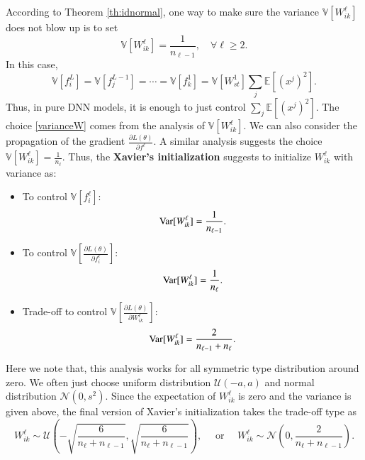 According to Theorem \ref{th:idnormal}, one way to make sure the variance $\mathbb{V}[W^\ell_{ik}]$ does not blow up is to set 
\begin{equation}\label{varianceW}
\mathbb{V}[W^\ell_{ik}] = \frac{1}{n_{\ell-1}}, \quad \forall \ell \ge 2.
\end{equation}
In this case,
\begin{equation}
\mathbb V [f^{L}_i] = \mathbb V [f^{L-1}_j] = \cdots =  \mathbb V [f^{1}_k] = \mathbb{V}[W^1_{st}]\sum_{j}\mathbb{E}[(x^j)^2].
\end{equation}
Thus, in pure DNN models, it is enough to just control $\displaystyle \sum_{j}\mathbb{E}[(x^j)^2]$.
The choice \eqref{varianceW} comes from the analysis of $\mathbb{V}[W^\ell_{ik}]$. We can also consider the propagation of the gradient $\frac{\partial L(\theta)}{\partial f^\ell}$. A similar analysis suggests the choice 
$
\mathbb{V}[W^\ell_{ik}] = \frac{1}{n_{\ell}}.
$
Thus, the {\bf Xavier's initialization} suggests to initialize $W^\ell_{ik}$ with variance as:
\begin{itemize}
	\item To control $\mathbb V [f^{\ell}_i] $:
	\begin{equation}\label{key}
	{\rm Var}[W^\ell_{ik}] = \frac{1}{n_{\ell-1}}.
	\end{equation}
	\item To control $\mathbb{V}[\frac{\partial L(\theta)}{\partial f_i^\ell}]$:
	\begin{equation}\label{key}
	{\rm Var}[W^\ell_{ik}] = \frac{1}{n_{\ell}}.
	\end{equation}
	\item Trade-off to control $\mathbb{V} [\frac{\partial L(\theta)}{\partial W_{ik}^\ell}]$: 
	\begin{equation}\label{key}
	{\rm Var}[W^\ell_{ik}] = \frac{2}{n_{\ell-1} + n_\ell}.
	\end{equation}
\end{itemize}
Here we note that, this analysis works for all symmetric type distribution around zero. We often just choose uniform distribution $\mathcal U(-a,a)$ and normal distribution $\mathcal N(0,s^2)$. Since the expectation of $W^{\ell}_{ik}$ is zero and the variance is given above, the final version of Xavier's initialization takes the trade-off type as
\begin{equation}
W^{\ell}_{ik} \sim \mathcal{U}(-\sqrt{\frac{6}{n_\ell+n_{\ell-1}}}, \sqrt{\frac{6}{n_\ell+n_{\ell-1}}}),\quad \text{ or }\quad
W^{\ell}_{ik} \sim \mathcal{N}(0,  {\frac{2}{n_\ell+n_{\ell-1}}}).
\end{equation}


